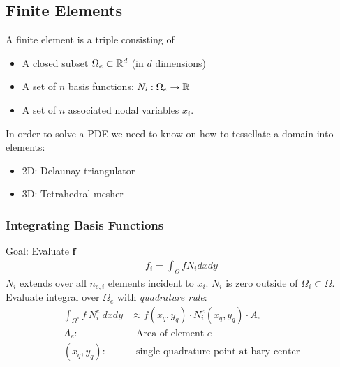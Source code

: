 \begin{multicols}{2}
\subsection{Finite Elements}
A finite element is a triple consisting of 
\begin{itemize}
	\item A closed subset $\Omega_e \subset \mathbb{R}^d$ (in $d$ dimensions)
	\item A set of $n$ basis functions: $N_i: \Omega_e \rightarrow \mathbb{R}$
	\item A set of $n$ associated nodal variables $x_i$.
\end{itemize}
In order to solve a PDE we need to know on how to tessellate a domain into elements:
\begin{itemize}
	\item 2D: Delaunay triangulator
	\item 3D: Tetrahedral mesher
\end{itemize}

\subsubsection{Integrating Basis Functions}
Goal: Evaluate $\mathbf f$
\begin{align*}
	f_i = \int_\Omega fN_idxdy
\end{align*}
$N_i$ extends over all $n_{e,i}$ elements incident to $x_i$. $N_i$ is zero outside of $\Omega_i \subset \Omega$. Evaluate integral over $\Omega_e$ with \emph{quadrature rule}:
\begin{align*}
	\int_{\Omega^e} f\ N_i^e\ dxdy &\approx f(x_q, y_q)\cdot N_i^e(x_q, y_q)\cdot A_e\\
	A_e:&\ \text{ Area of element } e\\
	(x_q, y_q):&\ \text{ single quadrature point at bary-center}
\end{align*}


\end{multicols}
